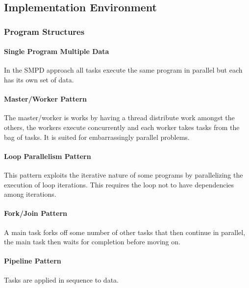 \subsection{Implementation Environment}

\subsubsection{Program Structures}

\paragraph{Single Program Multiple Data}
In the SMPD approach all tasks execute the same program in parallel but each has its own set of data.

\paragraph{Master/Worker Pattern}
The master/worker is works by having a thread distribute work amongst the others,
the workers execute concurrently and each worker takes tasks from the bag of tasks.
It is suited for embarrassingly parallel problems.

\paragraph{Loop Parallelism Pattern}
This pattern exploits the iterative nature of some programs by parallelizing the execution of loop iterations.
This requires the loop not to have dependencies among iterations.

\paragraph{Fork/Join Pattern}
A main task forks off some number of other tasks that then continue in parallel, the main task then waits for completion before moving on.

\paragraph{Pipeline Pattern}
Tasks are applied in sequence to data.
